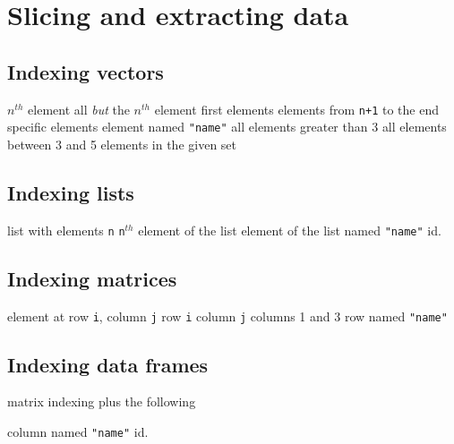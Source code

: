 \section{Slicing and extracting data}{}

\subsection{Indexing vectors}{}
	{ $ n^{th} $ element}
	{all {\it but} the $ n^{th} $ element}
	{first elements}
	{elements from {\tt n+1} to the end}
	{specific elements}
	{element named {\tt "name"}}
	{all elements greater than 3}
	{all elements between 3 and 5}
	{elements in the given set}

\subsection{Indexing lists}{}

	{list with elements {\tt n}}
	{{\tt n}$^{th}$ element of the list}
	{element of the list named {\tt "name"}}
	{id.}


\subsection{Indexing matrices}{}

	{element at row {\tt i}, column {\tt j}}
	{row {\tt i}}
	{column {\tt j}}
	{columns 1 and 3}
	{row named {\tt "name"}}

\subsection{Indexing data frames}{matrix indexing plus the following}

	{column named {\tt "name"}}
	{id.}

